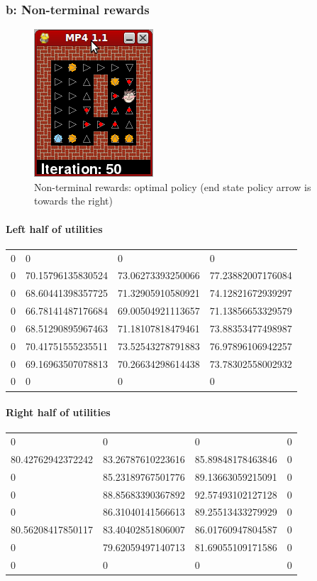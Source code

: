 \subsubsection{b: Non-terminal rewards}
\begin{figure}[H]
  \centering
  \includegraphics[width=0.2\linewidth]{graphics/inf_11_opti_policy.png}
  \caption{Non-terminal rewards: optimal policy (end state policy arrow is towards the right)}
\end{figure}

\paragraph{Left half of utilities}
\begin{tabular}{|l|l|l|l|}
0 & 0 & 0 & 0 \\
0 & 70.15796135830524 & 73.06273393250066 & 77.23882007176084 \\
0 & 68.60441398357725 & 71.32905910580921 & 74.12821672939297 \\
0 & 66.78141487176684 & 69.00504921113657 & 71.13856653329579 \\
0 & 68.51290895967463 & 71.18107818479461 & 73.88353477498987 \\
0 & 70.41751555235511 & 73.52543278791883 & 76.97896106942257 \\
0 & 69.16963507078813 & 70.26634298614438 & 73.78302558002932 \\
0 & 0 & 0 & 0 \\
\end{tabular}
\paragraph{Right half of utilities}
\begin{tabular}{|l|l|l|l|}
0 & 0 & 0 & 0 \\
80.42762942372242 & 83.26787610223616 & 85.89848178463846 & 0 \\
0 & 85.23189767501776 & 89.13663059215091 & 0 \\
0 & 88.85683390367892 & 92.57493102127128 & 0 \\
0 & 86.31040141566613 & 89.25513433279929 & 0 \\
80.56208417850117 & 83.40402851806007 & 86.01760947804587 & 0 \\
0 & 79.62059497140713 & 81.69055109171586 & 0 \\
0 & 0 & 0 & 0 \\
\end{tabular}

